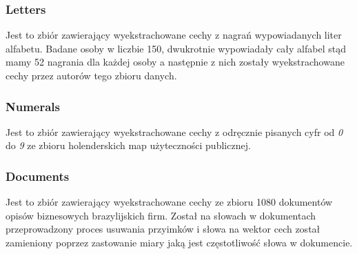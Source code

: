 \documentclass{classrep}
\begin{document}
{{            \subsubsection{Letters} {
                Jest to zbiór \cite{dataset_letters} zawierający wyekstrachowane cechy
                z nagrań wypowiadanych liter alfabetu. Badane osoby w liczbie 150,
                dwukrotnie wypowiadały cały alfabel stąd mamy 52 nagrania dla każdej
                osoby a następnie z nich zostały wyekstrachowane cechy przez autorów
                tego zbioru danych.
            }

            \subsubsection{Numerals} {
                Jest to zbiór \cite{dataset_numerals} zawierający wyekstrachowane cechy
                z odręcznie pisanych cyfr od \textit{0} do \textit{9} ze zbioru
                holenderskich map użyteczności publicznej.
            }

            \subsubsection{Documents} {
                Jest to zbiór \cite{dataset_documents} zawierający wyekstrachowane cechy
                ze zbioru 1080 dokumentów opisów biznesowych brazylijskich firm.
                Został na słowach w dokumentach przeprowadzony proces usuwania 
                przyimków i słowa na wektor cech został zamieniony poprzez zastowanie
                miary jaką jest częstotliwość słowa w dokumencie.
            }

        }
    }
    \newpage
\end{document}
